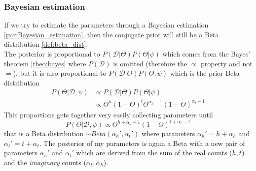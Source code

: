 \subsubsection{Bayesian estimation}
If we try to estimate the parameters through a Bayesian estimation
\ref{par:Bayesian_estimation}, then the conjugate prior will still be a Beta distribution
\ref{def:beta_dist}.\\ The posterior is proportional to $P(\mathcal{D}|\Theta)P(\Theta
|\psi)$ which comes from the Bayes' theorem \ref{theo:bayes} where
$P(\mathcal{D})$ is omitted (therefore the $\propto$ property and not $=$), but it
is also proportional to $P(\mathcal{D}|\Theta)P(\Theta,\psi)$ which is the prior
Beta distribution
\begin{align*}
	P(\Theta|\mathcal{D}, \psi) & \propto P(\mathcal{D}|\Theta)P(\Theta|\psi)                                  \\
	                            & \propto \Theta^{h}(1-\Theta)^{t}\Theta^{\alpha_h -1}(1-\Theta)^{\alpha_t -1}
\end{align*}
This proportions gets together very easily collecting parameters until
\[
	P(\Theta|\mathcal{D},\psi) \propto \Theta^{h+\alpha_h -1}(1 - \Theta)^{t +
	\alpha_t -1}
\]
that is a Beta distribution $\sim Beta(\alpha_{h}',\alpha_{t}')$ where parameters
$\alpha_{h}'= h+\alpha_{h}$ and $\alpha_{t}' = t + \alpha_{t}$. The posterior of
my parameters is again a Beta with a new pair of parameters $\alpha_{h}'$ and
$\alpha_{t}'$ which are derived from the sum of the real counts ($h, t$) and the
\textit{imaginary} counts ($\alpha_{t}, \alpha_{h}$).\\

